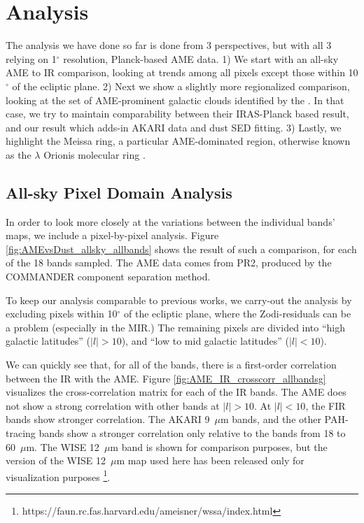 \documentclass[preprint2,longabstract]{aastex}
\begin{document}
\section{Analysis}
\label{sec:analysis}

    The analysis we have done so far is done from 3 perspectives, but with all 3 relying on 1$^{\circ}$ resolution, Planck-based AME data. 1) We start with an all-sky AME to IR comparison, looking at trends among all pixels except those within 10$^{\circ}$ of the ecliptic plane. 2) Next we show a slightly more regionalized comparison, looking at the set of AME-prominent galactic clouds identified by the \cite{planckXV}. In that case, we try to maintain comparability between their IRAS-Planck based result, and our result which adds-in AKARI data and dust SED fitting. 3) Lastly, we highlight the Meissa ring, a particular AME-dominated region, otherwise known as the $\lambda$ Orionis molecular ring \citep{maddalena86,maddalena87}.

\subsection{All-sky Pixel Domain Analysis}

	In order to look more closely at the variations between the individual bands' maps, we include a pixel-by-pixel analysis. Figure \ref{fig:AMEvsDust_allsky_allbands} shows the result of such a comparison, for each of the 18 bands sampled. The AME data comes from PR2, produced by the COMMANDER component separation method.

    To keep our analysis comparable to previous works, we carry-out the analysis by excluding pixels within 10$^{\circ}$ of the ecliptic plane, where the Zodi-residuals can be a problem (especially in the MIR.) The remaining pixels are divided into ``high galactic latitudes'' ($|l|>10$), and ``low to mid galactic latitudes'' ($|l|<10$).

    We can quickly see that, for all of the bands, there is a first-order correlation between the IR with the AME. Figure \ref{fig:AME_IR_crosscorr_allbandsg} visualizes the cross-correlation matrix for each of the IR bands. The AME does not show a strong correlation with other bands at $|l|>10$. At $|l|<10$, the FIR bands show stronger correlation. The AKARI 9~$\mu$m bands, and the other PAH-tracing bands show a stronger correlation only relative to the bands from 18 to 60~$\mu$m. The WISE 12~$\mu$m band is shown for comparison purposes, but the version of the WISE 12~$\mu$m map used here has been released only for visualization purposes \footnote{https://faun.rc.fas.harvard.edu/ameisner/wssa/index.html}.
\end{document}

